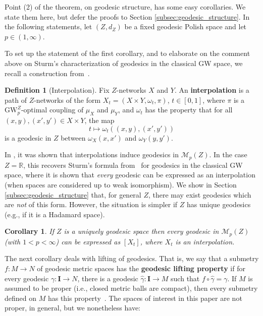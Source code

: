 \documentclass{article}
\newtheorem{corollary}[proposition]{Corollary}
\theoremstyle{definition}
\newtheorem{definition}[proposition]{Definition}
\newcommand{\R}{\mathbb{R}}
\newcommand{\M}{\mathcal{M}}
\newcommand{\MZp}{\M_p(Z)}
\newcommand{\dgwz}{\mathrm{GW}_p^Z}
\begin{document}
%
%
%
%
%
%
%
%
%
%
%
%

Point (2) of the theorem, on geodesic structure, has some easy corollaries. We state them here, but defer the proofs to Section \ref{subsec:geodesic_structure}. In the following statements, let $(Z,d_Z)$ be a fixed geodesic Polish space and let $p \in (1,\infty)$. 

To set up the statement of the first corollary, and to elaborate on the comment above on Sturm's characterization of geodesics in the classical GW space, we recall a construction from~\cite{bauer2025zgromovwassersteindistance}.  

\begin{definition}[Interpolation]\label{def:interpolation}
    Fix $Z$-networks $X$ and $Y$. An \textbf{interpolation} is a path of $Z$-networks of the form $X_t = (X \times Y, \omega_t, \pi)$, $t \in [0,1]$,  where $\pi$ is a $\dgwz$-optimal coupling of $\mu_X$ and $\mu_Y$, and $\omega_t$ has the property that for all $(x,y),(x',y') \in X \times Y$, the map
    \[
    t \mapsto \omega_t((x,y),(x',y'))
    \]
    is a geodesic in $Z$ between $\omega_X(x,x')$ and $\omega_Y(y,y')$. 
\end{definition} 

In \cite[Theorem 45]{bauer2025zgromovwassersteindistance}, it was shown that interpolations induce geodesics in $\MZp$. In the case $Z = \R$, this recovers Sturm's formula from~\cite{sturm2020} for geodesics in the classical GW space, where it is shown that \emph{every} geodesic can be expressed as an interpolation (when spaces are considered up to weak isomorphism). We show in Section \ref{subsec:geodesic_structure} that, for general $Z$, there may exist  geodesics which are \emph{not} of this form. However, the situation is simpler if $Z$ has unique geodesics (e.g., if it is a Hadamard space).

\begin{corollary}\label{cor:uniquely_geodesic}
    If $Z$ is a uniquely geodesic space then every geodesic in $\MZp$ (with $1 < p < \infty$) can be expressed as $[X_t]$, where $X_t$ is an interpolation.
\end{corollary}

The next corollary deals with lifting of geodesics. That is, we say that a submetry $f:M \to N$ of geodesic metric spaces has the \textbf{geodesic lifting property} if for every geodesic $\gamma:\mathbf{I} \to N$, there is a geodesic $\hat{\gamma}:\mathbf{I} \to M$ such that $f \circ \hat{\gamma} = \gamma$. If $M$ is assumed to be proper (i.e., closed metric balls are compact), then every submetry defined on $M$ has this property~\cite[Lemma 2.8]{kapovitch2022structure}. The spaces of interest in this paper are not proper, in general, but we nonetheless have:
\end{document}
